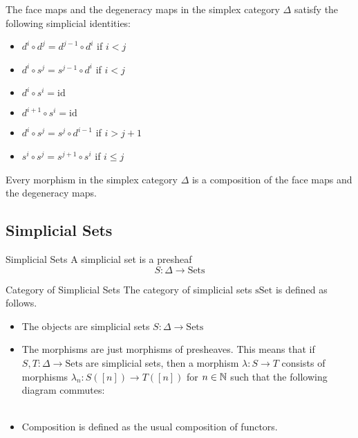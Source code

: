 \documentclass[a4paper]{article}
\begin{document}
\begin{prp}{}{} The face maps and the degeneracy maps in the simplex category $\Delta$ satisfy the following simplicial identities: 
\begin{itemize}
\item $d^i\circ d^j=d^{j-1}\circ d^i$ if $i<j$
\item $d^i\circ s^j=s^{j-1}\circ d^i$ if $i<j$
\item $d^i\circ s^i=\text{id}$
\item $d^{i+1}\circ s^i=\text{id}$
\item $d^i\circ s^j=s^j\circ d^{i-1}$ if $i>j+1$
\item $s^i\circ s^j=s^{j+1}\circ s^i$ if $i\leq j$
\end{itemize}
\end{prp}

\begin{prp}{}{} Every morphism in the simplex category $\Delta$ is a composition of the face maps and the degeneracy maps. 
\end{prp}

\subsection{Simplicial Sets}
\begin{defn}{Simplicial Sets}{} A simplicial set is a presheaf $$S:\Delta\to\text{Sets}$$ 
\end{defn}

\begin{defn}{Category of Simplicial Sets}{} The category of simplicial sets $\text{sSet}$ is defined as follows. 
\begin{itemize}
\item The objects are simplicial sets $S:\Delta\to\text{Sets}$
\item The morphisms are just morphisms of presheaves. This means that if $S,T:\Delta\to\text{Sets}$ are simplicial sets, then a morphism $\lambda:S\to T$ consists of morphisms $\lambda_n:S([n])\to T([n])$ for $n\in\mathbb{N}$ such that the following diagram commutes: \\~\\
\item Composition is defined as the usual composition of functors. 
\end{itemize}
\end{defn}
\end{document}
